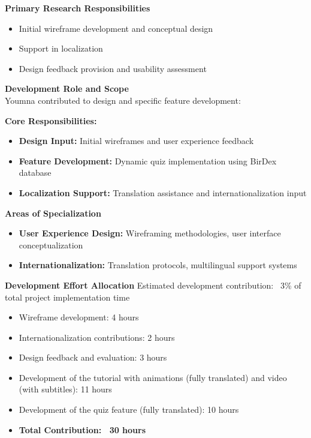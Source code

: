 \textbf{Primary Research Responsibilities}
\begin{itemize}
    \item Initial wireframe development and conceptual design
    \item Support in localization
    \item Design feedback provision and usability assessment
\end{itemize}

\textbf{Development Role and Scope}\\
Youmna contributed to design and specific feature development:

\textbf{Core Responsibilities:}
\begin{itemize}
    \item \textbf{Design Input:} Initial wireframes and user experience feedback
    \item \textbf{Feature Development:} Dynamic quiz implementation using BirDex database
    \item \textbf{Localization Support:} Translation assistance and internationalization input
\end{itemize}

\textbf{Areas of Specialization}
\begin{itemize}
    \item \textbf{User Experience Design:} Wireframing methodologies, user interface conceptualization
    \item \textbf{Internationalization:} Translation protocols, multilingual support systems
\end{itemize}

\textbf{Development Effort Allocation}
Estimated development contribution: ~3\% of total project implementation time
\begin{itemize}
    \item Wireframe development: 4 hours
    \item Internationalization contributions: 2 hours
    \item Design feedback and evaluation: 3 hours
    \item Development of the tutorial with animations (fully translated) and video (with subtitles): 11 hours
    \item Development of the quiz feature (fully translated): 10 hours
    \item \textbf{Total Contribution: ~30 hours}
\end{itemize}



